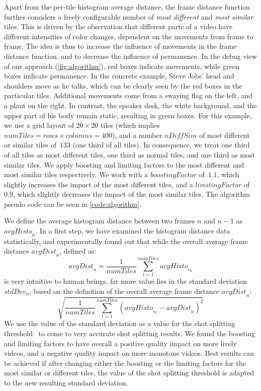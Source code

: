 \documentclass{acm_proc_article-sp}
\begin{document}
Apart from the per-tile histogram average distance, the frame distance function further considers a freely configurable number of \emph{most different} and \emph{most similar} tiles. This is driven by the observation that different parts of a video have different intensities of color changes, dependent on the movements from frame to frame. The idea is thus to increase the influence of movements in the frame distance function, and to decrease the influence of permanence. In the debug view of our approach (\autoref{fig:algorithm}), red boxes indicate movements, while green boxes indicate permanence. In the concrete example, Steve Jobs' head and shoulders move as he talks, which can be clearly seen by the red boxes in the particular tiles. Additional movements come from a swaying flag on the left, and a plant on the right. In contrast, the speaker desk, the white background, and the upper part of his body remain static, resulting in green boxes. For this example, we use a grid layout of $\mathit{20} \times \mathit{20}$ tiles (which implies $\mathit{numTiles} = \mathit{rows} \times \mathit{columns} = 400$), and a number $\mathit{nDiffSim}$ of most different or similar tiles of~$\mathit{133}$ (one third of all tiles). In consequence, we treat one third of all tiles as most different tiles, one third as normal tiles, and one third as most similar tiles. We apply boosting and limiting factors to the most different and most similar tiles respectively. We work with a $\mathit{boostingFactor}$ of~$\mathit{1.1}$, which slightly increases the impact of the most different tiles, and a $\mathit{limitingFactor}$ of~$\mathit{0.9}$, which slightly decreases the impact of the most similar tiles. The algorithm pseudo code can be seen in \autoref{code:algorithm}.

We define the average histogram distance between two frames $\mathit{n}$ and $\mathit{n - 1}$ as $\mathit{avgHisto}_{n}$. In a first step, we have examined the histogram distance data statistically, and experimentally found out that while the overall average frame distance $\mathit{avgDist}_{n}$, defined as: $$\mathit{avgDist}_{n} = \frac{1}{\mathit{numTiles}}\sum_{t=1}^{\mathit{numTiles}}\mathit{avgHisto}_{n_{t}}$$ is very intuitive to human beings, far more value lies in the standard deviation $\mathit{stdDev}_{n}$, based on the definition of the overall average frame distance $\mathit{avgDist}_{n}$: $$\sqrt{\frac{1}{\mathit{numTiles}}\sum_{t=1}^{\mathit{numTiles}}(\mathit{avgHisto}_{n_{t}} - \mathit{avgDist}_{n})^{2}}$$ We use the value of the standard deviation as a value for the shot splitting threshold~\cite{Lienhart1999} to come to very accurate shot splitting results. We found the boosting and limiting factors to have overall a positive quality impact on more lively videos, and a negative quality impact on more monotone videos. Best results can be achieved if after changing either the boosting or the limiting factors for the most similar or different tiles, the value of the shot splitting threshold is adapted to the new resulting standard deviation.
\end{document}
